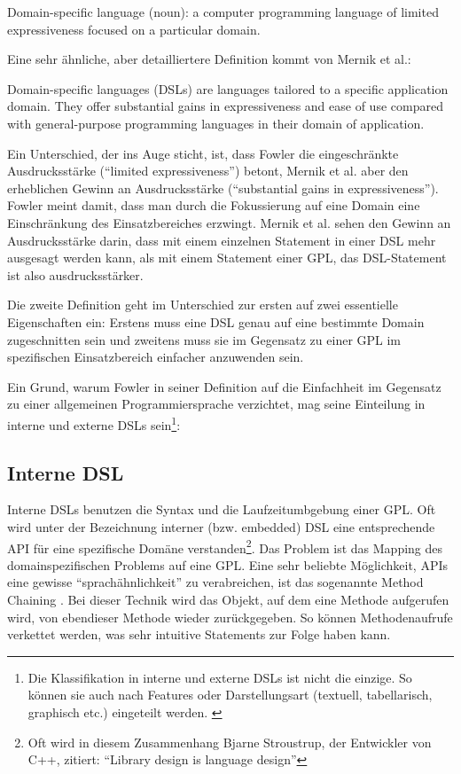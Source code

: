 \begin{myquote}
Domain-specific language (noun): a computer programming language of limited expressiveness focused on a particular domain. \cite{Fowl05}
\end{myquote}

Eine sehr ähnliche, aber detailliertere Definition kommt von Mernik et al.:

\begin{myquote}
Domain-specific languages (DSLs) are languages tailored to a specific application domain. They offer substantial gains in expressiveness and ease of use compared with general-purpose programming languages in their domain of application. \cite{MeHe05}
\end{myquote}


Ein Unterschied, der ins Auge sticht, ist, dass Fowler die eingeschränkte Ausdrucksstärke (``limited expressiveness'') betont, Mernik et al. aber den erheblichen Gewinn an Ausdrucksstärke (``substantial gains in expressiveness''). Fowler meint damit, dass man durch die Fokussierung auf eine Domain eine Einschränkung des Einsatzbereiches erzwingt. Mernik et al. sehen den Gewinn an Ausdrucksstärke darin, dass mit einem einzelnen Statement in einer DSL mehr ausgesagt werden kann, als mit einem Statement einer GPL, das DSL-Statement ist also ausdrucksstärker.

Die zweite Definition geht im Unterschied zur ersten auf zwei essentielle Eigenschaften ein: Erstens muss eine DSL genau auf eine bestimmte Domain zugeschnitten sein und zweitens muss sie im Gegensatz zu einer GPL im spezifischen Einsatzbereich einfacher anzuwenden sein.

Ein Grund, warum Fowler in seiner Definition auf die Einfachheit im Gegensatz zu einer allgemeinen Programmiersprache verzichtet, mag seine Einteilung in interne und externe DSLs \cite{FoPa10} sein\footnote{Die Klassifikation in interne und externe DSLs ist nicht die einzige. So können sie auch nach Features oder Darstellungsart (textuell, tabellarisch, graphisch etc.) eingeteilt werden. \cite{LaJi07} }:

\subsection{Interne DSL}

Interne DSLs benutzen die Syntax und die Laufzeitumbgebung einer GPL. Oft wird unter der Bezeichnung interner (bzw. embedded) DSL eine ent\-spre\-chen\-de API für eine spezifische Domäne verstanden\footnote{Oft wird in diesem Zusammenhang Bjarne Stroustrup, der Entwickler von C++, zitiert: ``Library design is language design''}.
Das Problem ist das Mapping des domainspezifischen Problems auf eine GPL. Eine sehr beliebte Möglichkeit, APIs eine gewisse ``sprachähnlichkeit'' zu verabreichen, ist das sogenannte Method Chaining
\cite{RuBa08}.
Bei dieser Technik wird das Objekt, auf dem eine Methode aufgerufen wird, von ebendieser Methode wieder zurückgegeben. So können Methodenaufrufe verkettet werden, was sehr intuitive Statements zur Folge haben kann.

